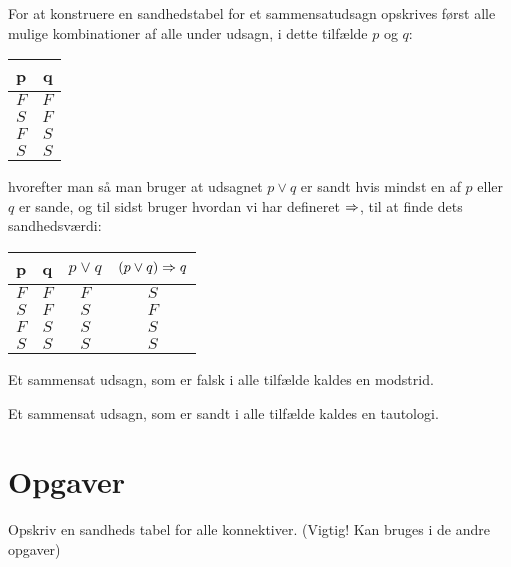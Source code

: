 \begin{eks}
    For at konstruere en sandhedstabel for et sammensatudsagn opskrives først alle mulige kombinationer af alle under udsagn, i dette tilfælde $p$ og $q$:
    \begin{center}
    \begin{tabular}{|l|r|}
        \hline
        p & q \\
        \hline
        $F$ & $F$ \\
        \hline
        $S$ & $F$ \\
        \hline
        $F$ & $S$ \\
        \hline
        $S$ & $S$ \\
        \hline
    \end{tabular}
    \end{center}
    hvorefter man så man bruger at udsagnet $p \lor q$ er sandt hvis mindst en af $p$ eller $q$ er sande,
    og til sidst bruger hvordan vi har defineret $\Rightarrow$,
    til at finde dets sandhedsværdi:
    \begin{center}
    \begin{tabular}{|c|c|c|c|}
        \hline
        p & q & $p \lor q$ & $(p \lor q) \Rightarrow q$ \\
        \hline
        $F$ & $F$ & $F$ & $S$ \\
        \hline
        $S$ & $F$ & $S$ & $F$ \\
        \hline
        $F$ & $S$ & $S$ & $S$ \\
        \hline
        $S$ & $S$ & $S$ & $S$ \\
        \hline
    \end{tabular}
    \end{center}
\end{eks}


\begin{dfn}[Modstrid]
    Et sammensat udsagn, som er falsk i alle tilfælde kaldes en modstrid.
\end{dfn}

\begin{dfn}[Tautologi]
    Et sammensat udsagn, som er sandt i alle tilfælde kaldes en tautologi.
\end{dfn}

\section{Opgaver}
\begin{opg}
    Opskriv en sandheds tabel for alle konnektiver. (Vigtig! Kan bruges i de andre opgaver)
\end{opg}


